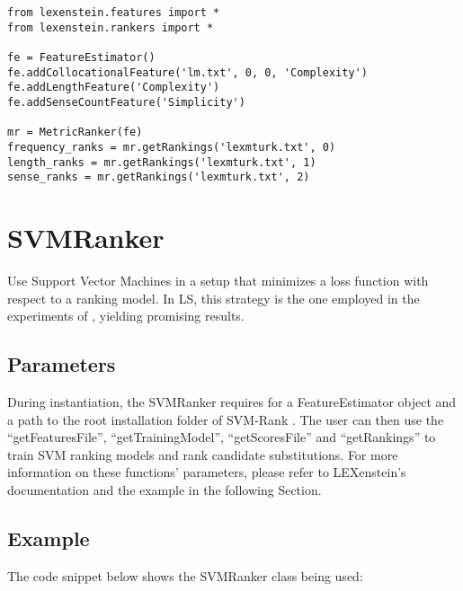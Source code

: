 \begin{lstlisting}
from lexenstein.features import *
from lexenstein.rankers import *

fe = FeatureEstimator()
fe.addCollocationalFeature('lm.txt', 0, 0, 'Complexity')
fe.addLengthFeature('Complexity')
fe.addSenseCountFeature('Simplicity')

mr = MetricRanker(fe)
frequency_ranks = mr.getRankings('lexmturk.txt', 0)
length_ranks = mr.getRankings('lexmturk.txt', 1)
sense_ranks = mr.getRankings('lexmturk.txt', 2)
\end{lstlisting}










\section{SVMRanker}

Use Support Vector Machines in a setup that minimizes a loss function with respect to a ranking model. In LS, this strategy is the one employed in the experiments of \cite{Horn2014}, yielding promising results.

\subsection{Parameters}

During instantiation, the SVMRanker requires for a FeatureEstimator object and a path to the root installation folder of SVM-Rank \cite{svmrank}. The user can then use the ``getFeaturesFile'', ``getTrainingModel'', ``getScoresFile'' and ``getRankings'' to train SVM ranking models and rank candidate substitutions. For more information on these functions' parameters, please refer to LEXenstein's documentation and the example in the following Section.

\subsection{Example}

The code snippet below shows the SVMRanker class being used:

